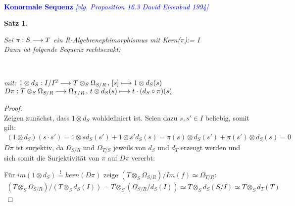 \documentclass[10pt,a4paper]{report}
\newcommand{\comment}[1]{}
\newcommand{\ModulsOfDifferenzials}{David Eisenbud 1994}
\newcounter{Aussage}[chapter]
\newtheorem{satz}[Aussage]{Satz}
\newcommand{\functionfront}[3]{\nolinebreak{#1:#2 \longrightarrow #3}}
\newcommand{\function}[5]{\nolinebreak{#1:#2 \longrightarrow #3 \, , \, #4 \longmapsto #5}}
\newcommand{\divR}[2]{\Omega_{#1/#2}}
\newcommand{\divf}[1]{d_{#1}}
\newcommand{\Tensor}[3]{#1 \otimes_{#2} #3}
\newcommand{\tensor}[3]{#1 \otimes #3}
\newcommand*{\defshow}{\stackrel{!}{=}}
\newcommand{\kernel}[1]{kern(#1)}
\newcommand{\immage}[1]{im(#1)}
\begin{document}
\ \\
\textcolor{blue}{\textbf{Konormale Sequenz} \textit{[vlg. Proposition 16.3 \ModulsOfDifferenzials]}}
\begin{satz} \label{Konormale Sequenz}
\raggedright
Sei $\functionfront{\pi}{S}{T}$ ein R-Algebrenephimorphismus mit Kern($\pi$):= I \\
Dann ist folgende Sequenz rechtsexakt: \\
\begin{center}
\ \\
\begin{spacing}{1.5}
mit: $\function{\tensor{1}{S}{\divf{S}}}{I/I^2}{{\Tensor{T}{S}{\divR{S}{R}}}}{[s]}{\tensor{1}{S}{\divf{S}(s)}}$\\
$\function{D\pi}{\Tensor{T}{S}{\divR{S}{R}}}{\divR{T}{R}}{\tensor{t}{S}{\divf{S}(s)}}{t \cdot (\divf{S} \circ \pi)(s)}$
\end{spacing}
\end{center}
\end{satz}
\begin{proof} \ \\
Zeigen zunächst, dass $\tensor{1}{S}{\divf{S}}$ wohldefiniert ist. Seien dazu $s,s' \in I$ beliebig, somit gilt:
\begin{gather*}
(\tensor{1}{S}{\divf{S}})(s \cdot s')
= \tensor{1}{S}{s\divf{S}(s')} + \tensor{1}{S}{s'\divf{S}(s)}
= \tensor{\pi(s)}{S}{\divf{S}(s')} + \tensor{\pi(s')}{S}{\divf{S}(s)}
= 0
\end{gather*}
$D\pi$ ist surjektiv, da $\divR{S}{R}$ und $\divR{T}{S}$ jeweils von $\divf{S}$ und $\divf{T}$ erzeugt werden und sich somit die Surjektivität von $\pi$ auf $D\pi$ vererbt:
\begin{center}
\end{center}
Für $\immage{\tensor{1}{S}{\divf{S}}} \defshow \kernel{D\pi}$ zeige $(\Tensor{T}{S}{\divR{S}{R}})/Im(f) \simeq \divR{T}{R}$:
\begin{gather*}
\comment{
(\Tensor{T}{S}{\divR{S}{R}})/Im(f) \\
= (\Tensor{T}{S}{\divR{S}{R}})/(\Tensor{T}{S}{\divf{S}(I)}) \\
= \Tensor{T}{S}{(\divR{S}{R}/\divf{S}(I))} \\ 
= \Tensor{T}{S}{(\divf{S}(S)/ \divf{S}(I))} \\
\simeq \Tensor{T}{S}{\divf{S}(S/I)} \\
\simeq \Tensor{T}{S}{\divf{T}(T)} \\
}
(\Tensor{T}{S}{\divR{S}{R}})/(\Tensor{T}{S}{\divf{S}(I)})
= \Tensor{T}{S}{(\divR{S}{R}/\divf{S}(I))}
\simeq \Tensor{T}{S}{\divf{S}(S/I)}
\simeq \Tensor{T}{S}{\divf{T}(T)}
\end{gather*}
\end{proof}
\end{document}
